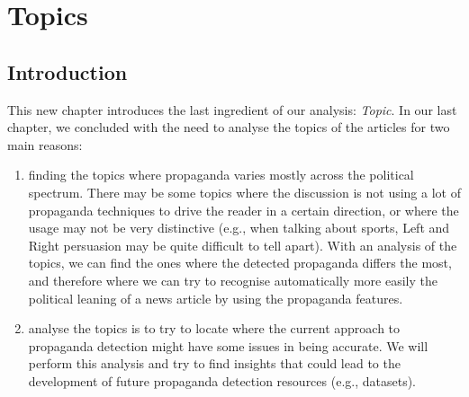 \chapter{\statusorange Topics}
\label{chap:topics}

\section{Introduction}






This new chapter introduces the last ingredient of our analysis: \emph{Topic}.
In our last chapter, we concluded with the need to analyse the topics of the articles for two main reasons:

\begin{enumerate}
    \item finding the topics where propaganda varies mostly across the political spectrum. There may be some topics where the discussion is not using a lot of propaganda techniques to drive the reader in a certain direction, or where the usage may not be very distinctive (e.g., when talking about sports, Left and Right persuasion may be quite difficult to tell apart). With an analysis of the topics, we can find the ones where the detected propaganda differs the most, and therefore where we can try to recognise automatically more easily the political leaning of a news article by using the propaganda features.
    \item analyse the topics is to try to locate where the current approach to propaganda detection might have some issues in being accurate. We will perform this analysis and try to find insights that could lead to the development of future propaganda detection resources (e.g., datasets).
\end{enumerate}


